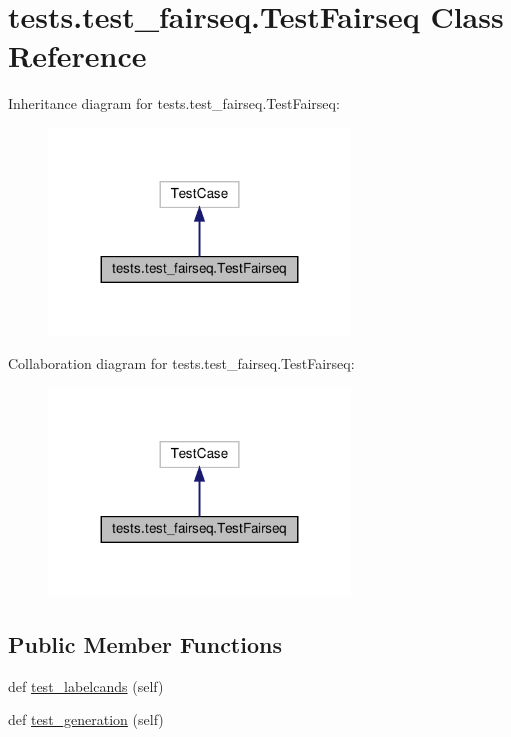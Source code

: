 \hypertarget{classtests_1_1test__fairseq_1_1TestFairseq}{}\section{tests.\+test\+\_\+fairseq.\+Test\+Fairseq Class Reference}
\label{classtests_1_1test__fairseq_1_1TestFairseq}


Inheritance diagram for tests.\+test\+\_\+fairseq.\+Test\+Fairseq\+:
\nopagebreak
\begin{figure}[H]
\begin{center}
\leavevmode
\includegraphics[width=227pt]{classtests_1_1test__fairseq_1_1TestFairseq__inherit__graph}
\end{center}
\end{figure}


Collaboration diagram for tests.\+test\+\_\+fairseq.\+Test\+Fairseq\+:
\nopagebreak
\begin{figure}[H]
\begin{center}
\leavevmode
\includegraphics[width=227pt]{classtests_1_1test__fairseq_1_1TestFairseq__coll__graph}
\end{center}
\end{figure}
\subsection*{Public Member Functions}
\begin{DoxyCompactItemize}
\item 
def \hyperlink{classtests_1_1test__fairseq_1_1TestFairseq_a59b33ca3a07d16dbfe630c806d6c9aa3}{test\+\_\+labelcands} (self)
\item 
def \hyperlink{classtests_1_1test__fairseq_1_1TestFairseq_aebd6e9deb59f248a1e1f7aff8443447a}{test\+\_\+generation} (self)
\end{DoxyCompactItemize}


